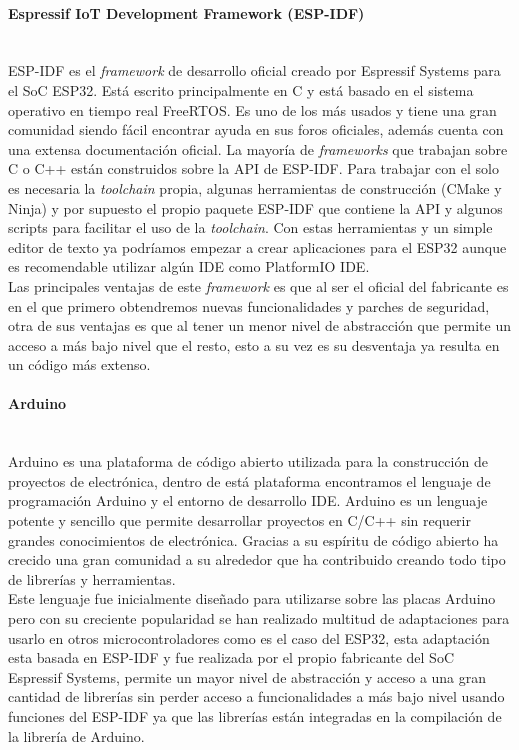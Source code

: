 \documentclass[../proyecto.tex]{subfiles}
\begin{document}
\paragraph{Espressif IoT Development Framework (ESP-IDF)}\mbox{}\\
ESP-IDF es el \textit{framework} de desarrollo oficial creado por Espressif Systems para el SoC ESP32. Está escrito principalmente en C  y está basado en el sistema operativo en tiempo real FreeRTOS. Es uno de los más usados y tiene una gran comunidad siendo fácil encontrar ayuda en sus foros oficiales, además cuenta con una extensa documentación oficial. La mayoría de \textit{frameworks} que trabajan sobre C o C++ están construidos sobre la API de ESP-IDF. Para trabajar con el solo es necesaria la \textit{toolchain} propia, algunas herramientas de construcción (CMake y Ninja) y por supuesto el propio paquete ESP-IDF que contiene la API y algunos scripts para facilitar el uso de la \textit{toolchain}. Con estas herramientas y un simple editor de texto ya podríamos empezar a crear aplicaciones para el ESP32 aunque es recomendable utilizar algún IDE como PlatformIO IDE.\\

 Las principales ventajas de este \textit{framework} es que al ser el oficial del fabricante es en el que primero obtendremos nuevas funcionalidades y parches de seguridad, otra de sus ventajas es que al tener un menor nivel de abstracción que permite un acceso a más bajo nivel que el resto, esto a su vez es su desventaja ya resulta en un código más extenso.

\paragraph{Arduino}\mbox{}\\
Arduino es una plataforma de código abierto utilizada para la construcción de proyectos de electrónica, dentro de está plataforma encontramos el lenguaje de programación Arduino y el entorno de desarrollo IDE. Arduino es un lenguaje potente y sencillo que permite desarrollar proyectos en C/C++ sin requerir grandes conocimientos de electrónica. Gracias a su espíritu de código abierto ha crecido una gran comunidad a su alrededor que ha contribuido creando todo tipo de librerías y herramientas.\\

Este lenguaje fue inicialmente diseñado para utilizarse sobre las placas Arduino pero con su creciente popularidad se han realizado multitud de adaptaciones para usarlo en otros microcontroladores como es el caso del ESP32, esta adaptación esta basada en ESP-IDF y fue realizada por el propio fabricante del SoC Espressif Systems, permite un mayor nivel de abstracción y acceso a una gran cantidad de librerías sin perder acceso a funcionalidades a más bajo nivel usando funciones del ESP-IDF ya que las librerías están integradas en la compilación de la librería de Arduino.\\
\end{document}
